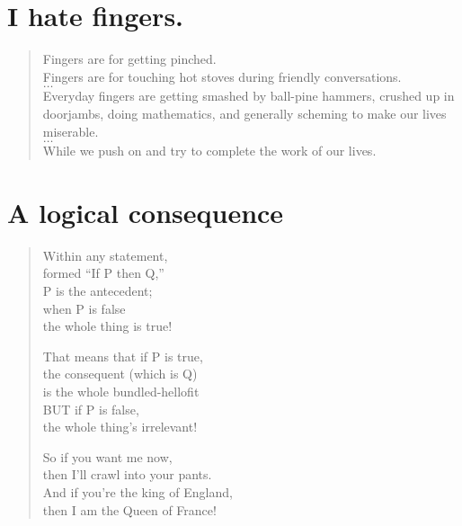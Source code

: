 \documentclass[times,12pt]{book}
\begin{document}
\section*{I hate fingers.}
\begin{verse}
Fingers are for getting pinched.\\
Fingers are for touching hot stoves during friendly conversations.\\
$\ldots$\\
Everyday fingers are getting smashed by ball-pine hammers, crushed up in doorjambs, doing mathematics, and generally scheming to make our lives miserable.\\
$\ldots$\\
While we push on and try to complete the work of our lives.\\
\end{verse}
\newpage

\section*{A logical consequence}
\begin{verse}
Within any statement,\\
formed ``If P then Q,''\\
P is the antecedent;\\
when P is false\\
the whole thing is true!

That means that if P is true,\\
the consequent (which is Q)\\
is the whole bundled-hellofit\\
BUT if P is false,\\
the whole thing's irrelevant!

So if you want me now,\\
then I'll crawl into your pants.\\
And if you're the king of England,\\
then I am the Queen of France!
\end{verse} \newpage
\end{document}
